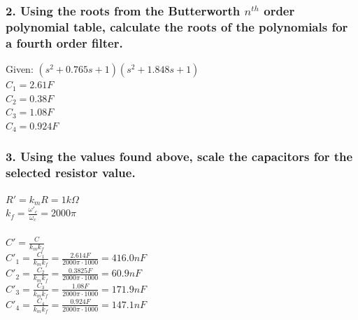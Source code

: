 \documentclass[11pt]{article}
\begin{document}
	\subsubsection*{2. Using the roots from the Butterworth $n^{th}$ order polynomial table, calculate the roots of the polynomials for a fourth order filter.}
	Given:
	$(s^{2}+0.765s+1)(s^{2}+1.848s+1)$\\
	$C_{1}=2.61F$\\
	$C_{2}=0.38F$\\
	$C_{3}=1.08F$\\
	$C_{4}=0.924F$\\
	\subsubsection*{3. Using the values found above, scale the capacitors for the selected resistor value.}
	
	$R'=k_{m}R=1k\Omega$\\
	$k_{f}= \frac{\omega'_{c}}{\omega_{c}}=2000\pi$\\\\
	$C'=\frac{C}{k_{m}k_{f}}$\\
	$C'_{1}=\frac{C_{1}}{k_{m}k_{f}}=\frac{2.614F}{2000\pi\cdot1000}=416.0nF$\\
	$C'_{2}=\frac{C_{2}}{k_{m}k_{f}}=\frac{0.3825F}{2000\pi\cdot1000}=60.9nF$\\	
	$C'_{3}=\frac{C_{3}}{k_{m}k_{f}}=\frac{1.08F}{2000\pi\cdot1000}=171.9nF$\\ 
	$C'_{4}=\frac{C_{4}}{k_{m}k_{f}}=\frac{0.924F}{2000\pi\cdot1000}=147.1nF$\\ 
\end{document}
